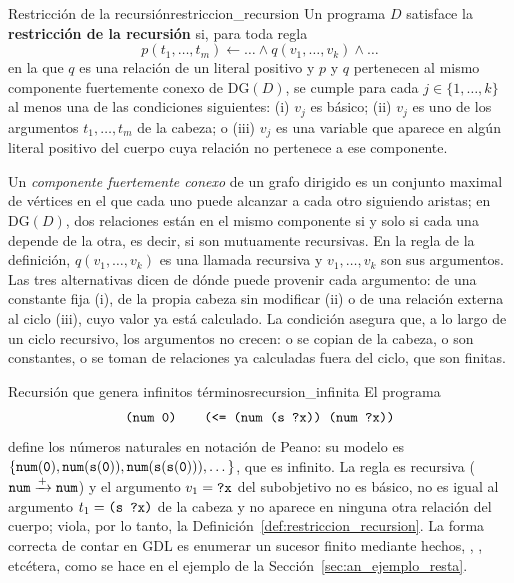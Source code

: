 \begin{definicion}{Restricción de la recursión}{restriccion_recursion}
Un programa $D$ satisface la \textbf{restricción de la recursión} si, para toda regla
\begin{equation*}
    p(t_1, \dots, t_m) \leftarrow \dots \land q(v_1, \dots, v_k) \land \dots
\end{equation*}
en la que $q$ es una relación de un literal positivo y $p$ y $q$ pertenecen al mismo componente fuertemente conexo de $\mathrm{DG}(D)$, se cumple para cada $j \in \{1, \dots, k\}$ al menos una de las condiciones siguientes: (i) $v_j$ es básico; (ii) $v_j$ es uno de los argumentos $t_1, \dots, t_m$ de la cabeza; o (iii) $v_j$ es una variable que aparece en algún literal positivo del cuerpo cuya relación no pertenece a ese componente.
\end{definicion}

Un \emph{componente fuertemente conexo} de un grafo dirigido es un conjunto maximal de vértices en el que cada uno puede alcanzar a cada otro siguiendo aristas; en $\mathrm{DG}(D)$, dos relaciones están en el mismo componente si y solo si cada una depende de la otra, es decir, si son mutuamente recursivas. En la regla de la definición, $q(v_1, \dots, v_k)$ es una llamada recursiva y $v_1, \dots, v_k$ son sus argumentos. Las tres alternativas dicen de dónde puede provenir cada argumento: de una constante fija (i), de la propia cabeza sin modificar (ii) o de una relación externa al ciclo (iii), cuyo valor ya está calculado. La condición asegura que, a lo largo de un ciclo recursivo, los argumentos no crecen: o se copian de la cabeza, o son constantes, o se toman de relaciones ya calculadas fuera del ciclo, que son finitas.

\begin{ejemplo}{Recursión que genera infinitos términos}{recursion_infinita}
El programa
\begin{equation*}
    \texttt{(num 0)} \qquad \texttt{(<= (num (s ?x)) (num ?x))}
\end{equation*}
define los números naturales en notación de Peano: su modelo es $\{\texttt{num}(\texttt{0}), \texttt{num}(\texttt{s}(\texttt{0})), \texttt{num}(\texttt{s}(\texttt{s}(\texttt{0}))), \dots\}$, que es infinito. La regla es recursiva ($\texttt{num} \xrightarrow{+} \texttt{num}$) y el argumento $v_1 = \texttt{?x}$ del subobjetivo no es básico, no es igual al argumento $t_1 = \texttt{(s ?x)}$ de la cabeza y no aparece en ninguna otra relación del cuerpo; viola, por lo tanto, la Definición~\ref{def:restriccion_recursion}. La forma correcta de contar en GDL es enumerar un sucesor finito mediante hechos, , , etcétera, como se hace en el ejemplo de la Sección~\ref{sec:an_ejemplo_resta}.
\end{ejemplo}

